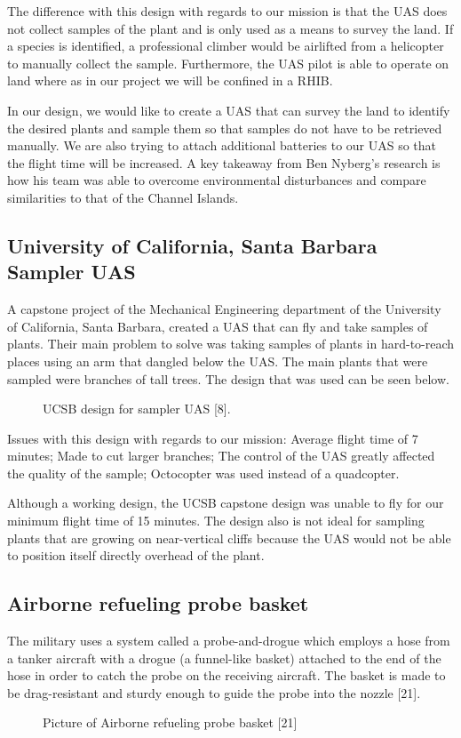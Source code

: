 \documentclass{wrcecapstone}
\begin{document}
The difference with this design with regards to our mission is that the UAS does not collect samples of the plant and is only used as a means to survey the land. If a species is identified, a professional climber would be airlifted from a helicopter to manually collect the sample. Furthermore, the UAS pilot is able to operate on land where as in our project we will be confined in a RHIB. 

In our design, we would like to create a UAS that can survey the land to identify the desired plants and sample them so that samples do not have to be retrieved manually.  We are also trying to attach additional batteries to our UAS so that the flight time will be increased. A key takeaway from Ben Nyberg’s research is how his team was able to overcome environmental disturbances and compare similarities to that of the Channel Islands. 

\subsection{University of California, Santa Barbara Sampler UAS}
A capstone project of the Mechanical Engineering department of the University of California, Santa Barbara, created a UAS that can fly and take samples of plants.  Their main problem to solve was taking samples of plants in hard-to-reach places using an arm that dangled below the UAS.  The main plants that were sampled were branches of tall trees.  The design that was used can be seen below.
\begin{figure}
\caption{UCSB design for sampler UAS [8].}
\end{figure}

Issues with this design with regards to our mission: Average flight time of 7 minutes; Made to cut larger branches; The control of the UAS greatly affected the quality of the sample; Octocopter was used instead of a quadcopter.

Although a working design, the UCSB capstone design was unable to fly for our minimum flight time of 15 minutes.  The design also is not ideal for sampling plants that are growing on near-vertical cliffs because the UAS would not be able to position itself directly overhead of the plant. 

\subsection{Airborne refueling probe basket}
The military uses a system called a probe-and-drogue which employs a hose from a tanker aircraft with a drogue (a funnel-like basket) attached to the end of the hose in order to catch the probe on the receiving aircraft.  The basket is made to be drag-resistant and sturdy enough to guide the probe into the nozzle [21].    
\begin{figure}
\caption{Picture of Airborne refueling probe basket [21]}
\end{figure}
\end{document}
